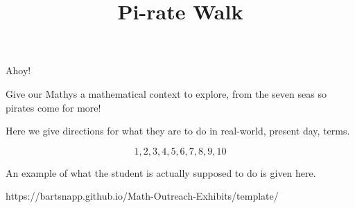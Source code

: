 \documentclass{../exhibit}
\title{Pi-rate Walk}
\begin{document}
\begin{context}
  Ahoy!

  Give our Mathys a mathematical context to explore, from the seven
  seas  so pirates come for more!
\end{context}



\begin{directions}
  Here we give directions for what they are to do in real-world,
  present day, terms.

  \[
  1,2,3,4,5,6,7,8,9,10
  \]
  \scalebox{3}{$\pi$}
\end{directions}



\begin{example}
  An example of what the student is actually supposed to do is given
  here.
\end{example}



\begin{mathConnections}
  https://bartsnapp.github.io/Math-Outreach-Exhibits/template/
\end{mathConnections}
\end{document}
